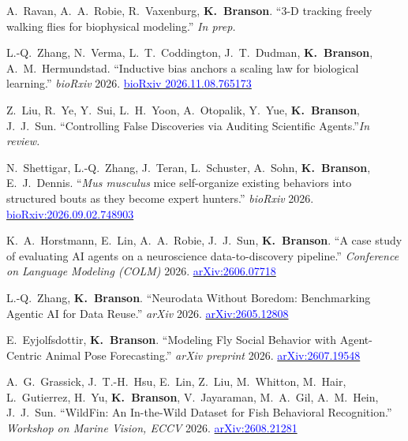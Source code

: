 \begin{cvenum}

\item A.~Ravan, A.~A.~Robie, R.~Vaxenburg, {\bf K.~Branson}. ``3-D tracking freely walking flies for biophysical modeling.'' {\em In prep.}

\item L.-Q.~Zhang, N.~Verma, L.~T.~Coddington, J.~T.~Dudman, \textbf{K.~Branson}, A.~M.~Hermundstad. ``Inductive bias anchors a scaling law for biological learning.'' {\em bioRxiv} 2026. \href{ https://doi.org/10.64898/2026.11.08.765173}{\small\textcolor{blue}{bioRxiv 2026.11.08.765173}}

\item Z.~Liu, R.~Ye, Y.~Sui, L.~H.~Yoon, A.~Otopalik, Y.~Yue, {\bf K.~Branson}, J.~J.~Sun. 
``Controlling False Discoveries via Auditing Scientific Agents.''{\em In review.}

\item N.~Shettigar, L.-Q.~Zhang, J.~Teran, L.~Schuster, A.~Sohn, {\bf K.~Branson}, E.~J.~Dennis. ``{\em Mus musculus} mice self-organize existing behaviors into structured bouts as they become expert hunters.'' {\em bioRxiv} 2026. \href{https://doi.org/10.64898/2026.09.02.748903}{\small\textcolor{blue}{bioRxiv:2026.09.02.748903}}

\item K.~A.~Horstmann, E.~Lin, A.~A.~Robie, J.~J.~Sun, {\bf K.~Branson}. ``A case study of evaluating AI agents on a neuroscience data-to-discovery pipeline.'' {\em Conference on Language Modeling (COLM)} 2026. \href{https://arxiv.org/abs/2606.07718}{\small\textcolor{blue}{arXiv:2606.07718}}

\item L.-Q.~Zhang, {\bf K.~Branson}. ``Neurodata Without Boredom: Benchmarking Agentic AI for Data Reuse.'' {\em arXiv} 2026. \href{https://arxiv.org/abs/2605.12808}{\small\textcolor{blue}{arXiv:2605.12808}}

\item E.~Eyjolfsdottir, {\bf K.~Branson}. ``Modeling Fly Social Behavior with Agent-Centric Animal Pose Forecasting.'' {\em arXiv preprint} 2026. \href{https://arxiv.org/abs/2607.19548}{\small\textcolor{blue}{arXiv:2607.19548}}

\item A.~G.~Grassick, J.~T.-H.~Hsu, E.~Lin, Z.~Liu, M.~Whitton, M.~Hair, L.~Gutierrez, H.~Yu, {\bf K.~Branson}, V.~Jayaraman, M.~A.~Gil, A.~M.~Hein, J.~J.~Sun. ``WildFin: An In-the-Wild Dataset for Fish Behavioral Recognition.'' {\em Workshop on Marine Vision, ECCV} 2026. \href{https://arxiv.org/abs/2608.21281}{\small\textcolor{blue}{arXiv:2608.21281}}


\end{cvenum}
